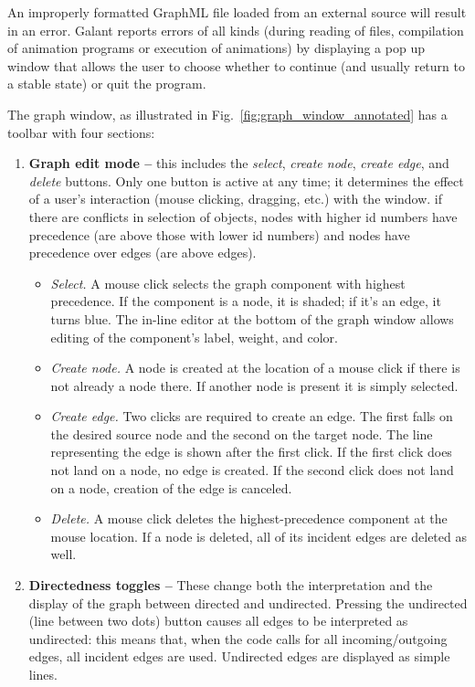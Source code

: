 An improperly formatted GraphML file loaded from an external source will
result in an error.
Galant reports errors of all kinds (during reading of files, compilation of
animation programs or execution of animations)
by displaying a pop up window that allows the user to choose whether to
continue (and usually return to a stable state) or quit the program.

The graph window, as illustrated in Fig.~\ref{fig:graph_window_annotated}
has a toolbar with four sections:
\begin{enumerate}
\item
\textbf{Graph edit mode -- }
this includes the \emph{select}, \emph{create node}, \emph{create edge}, and \emph{delete} buttons.
Only one button is active at any time; it determines the effect
of a user's interaction (mouse clicking, dragging, etc.) with the window.
if there are conflicts in selection of objects, nodes with higher id numbers have precedence (are above those with lower id numbers) and nodes
have precedence over edges (are above edges).
\begin{itemize}
\item \emph{Select.} A mouse click selects the graph component with highest precedence.
If the component is a node, it is shaded; if it's an edge, it turns blue.
The in-line editor at the bottom of the graph window allows editing of the
component's label, weight, and color.
\item \emph{Create node.}
A node is created at the location of a mouse click if there is not already a node there.
If another node is present it is simply selected.
\item \emph{Create edge.}
Two clicks are required to create an edge. The first falls on the desired
source node and the second on the target node.
The line representing the edge is shown after the first click.
If the first click does not land on a node, no edge is created.
If the second click does not land on a node, creation of the edge is canceled.
\item \emph{Delete.}
A mouse click deletes the highest-precedence component at the mouse location.
If a node is deleted, all of its incident edges are deleted as well.
\end{itemize}

\item
\textbf{Directedness toggles --}
These change both the interpretation and the
display of the graph between directed and undirected.
Pressing the undirected (line between two dots) button causes
all edges to be interpreted as undirected: this means that, when the code
calls for all incoming/outgoing edges, all incident edges are used.
Undirected edges are displayed as simple lines.


\end{enumerate}
